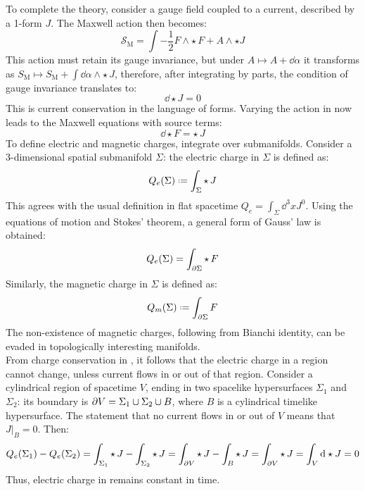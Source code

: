 To complete the theory, consider a gauge field coupled to a current, described by a 1-form $ J $. The Maxwell action then becomes:
\begin{equation}
  \mathcal{S}_{\text{M}} = \int - \frac{1}{2} F \wedge \star\, F + A \wedge \star J
\end{equation}
This action must retain its gauge invariance, but under $ A \mapsto A + \dd \alpha $ it transforms as $ S_{\text{M}} \mapsto S_{\text{M}} + \int \dd \alpha \wedge \star\, J $, therefore, after integrating by parts, the condition of gauge invariance translates to:
\begin{equation}
  \dd \star J = 0
  \label{eq:charge-cons}
\end{equation}
This is current conservation in the language of forms. Varying the action in  now leads to the Maxwell equations with source terms:
\begin{equation}
  \dd \star F = \star\, J
\end{equation}
To define electric and magnetic charges, integrate over submanifolds. Consider a 3-dimensional spatial submanifold $ \Sigma $: the electric charge in $ \Sigma $ is defined as:
\begin{equation}
  Q_e(\Sigma) \defeq \int_{\Sigma} \star\, J
\end{equation}
This agrees with the usual definition in flat spacetime $ Q_e = \int_{\Sigma} \dd^3 x J^0 $. Using the equations of motion and Stokes' theorem, a general form of Gauss' law is obtained:
\begin{equation}
  Q_e(\Sigma) = \int_{\partial \Sigma} \star\, F
  \label{eq:electric-charge}
\end{equation}
Similarly, the magnetic charge in $ \Sigma $ is defined as:
\begin{equation}
  Q_m(\Sigma) \defeq \int_{\pa \Sigma} F
\end{equation}
The non-existence of magnetic charges, following from Bianchi identity, can be evaded in topologically interesting manifolds.\\
From charge conservation in , it follows that the electric charge in a region cannot change, unless current flows in or out of that region. Consider a cylindrical region of spacetime $ V $, ending in two spacelike hypersurfaces $ \Sigma_1 $ and $ \Sigma_2 $: its boundary is $ \partial V = \Sigma_1 \cup \Sigma_2 \cup B $, where $ B $ is a cylindrical timelike hypersurface. The statement that no current flows in or out of $ V $ means that $ J \vert_B = 0 $. Then:
\begin{equation*}
  Q_e(\Sigma_1) - Q_e(\Sigma_2) = \int_{\Sigma_1} \star\, J - \int_{\Sigma_2} \star\, J = \int_{\partial V} \star\, J - \int_B \star\, J = \int_{\partial V} \star\, J = \int_V \mathrm{d} \star J = 0
\end{equation*}
Thus, electric charge in remains constant in time.

